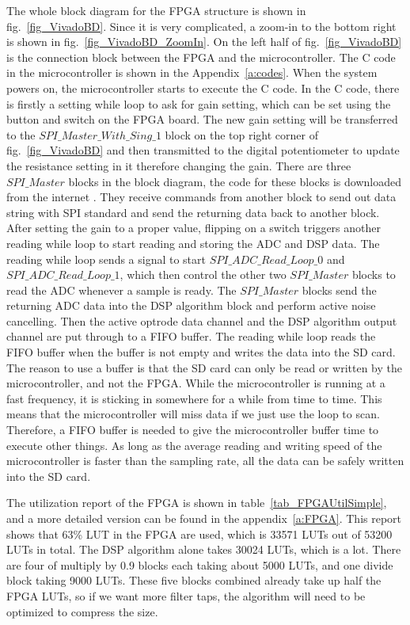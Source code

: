 The whole block diagram for the FPGA structure is shown in fig.~\ref{fig_VivadoBD}.  Since it is very complicated, a zoom-in to the bottom right is shown in fig.~\ref{fig_VivadoBD_ZoomIn}.  On the left half of fig.~\ref{fig_VivadoBD} is the connection block between the FPGA and the microcontroller.  The C code in the microcontroller is shown in the Appendix~\ref{a:codes}.  When the system powers on, the microcontroller starts to execute the C code.  In the C code, there is firstly a setting while loop to ask for gain setting, which can be set using the button and switch on the FPGA board.  The new gain setting will be transferred to the $SPI\_Master\_With\_Sing\_1$ block on the top right corner of fig.~\ref{fig_VivadoBD} and then transmitted to the digital potentiometer to update the resistance setting in it therefore changing the gain.  There are three $SPI\_Master$ blocks in the block diagram, the code for these blocks is downloaded from the internet \cite{SPIMaster}.  They receive commands from another block to send out data string with SPI standard and send the returning data back to another block.  After setting the gain to a proper value, flipping on a switch triggers another reading while loop to start reading and storing the ADC and DSP data.  The reading while loop sends a signal to start $SPI\_ADC\_Read\_Loop\_0$ and $SPI\_ADC\_Read\_Loop\_1$, which then control the other two $SPI\_Master$ blocks to read the ADC whenever a sample is ready.  The $SPI\_Master$ blocks send the returning ADC data into the DSP algorithm block and perform active noise cancelling.  Then the active optrode data channel and the DSP algorithm output channel are put through to a FIFO buffer.  The reading while loop reads the FIFO buffer when the buffer is not empty and writes the data into the SD card.  The reason to use a buffer is that the SD card can only be read or written by the microcontroller, and not the FPGA.  While the microcontroller is running at a fast frequency, it is sticking in somewhere for a while from time to time.  This means that the microcontroller will miss data if we just use the loop to scan.  Therefore, a FIFO buffer is needed to give the microcontroller buffer time to execute other things.  As long as the average reading and writing speed of the microcontroller is faster than the sampling rate, all the data can be safely written into the SD card.

The utilization report of the FPGA is shown in table~\ref{tab_FPGAUtilSimple}, and a more detailed version can be found in the appendix~\ref{a:FPGA}.  This report shows that 63\% LUT in the FPGA are used, which is 33571 LUTs out of 53200 LUTs in total.  The DSP algorithm alone takes 30024 LUTs, which is a lot.  There are four of multiply by 0.9 blocks each taking about 5000 LUTs, and one divide block taking 9000 LUTs.  These five blocks combined already take up half the FPGA LUTs, so if we want more filter taps, the algorithm will need to be optimized to compress the size.

